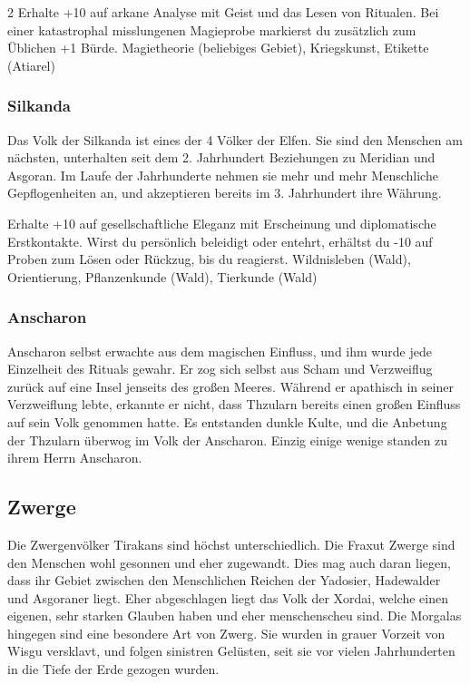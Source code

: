 {\begin{multicols*}{2}
        \abstammungspielwertebox
        {Erhalte +10 auf arkane Analyse mit Geist und das Lesen von Ritualen.}
        {Bei einer katastrophal misslungenen Magieprobe markierst du zusätzlich zum Üblichen +1 Bürde.}
        {Magietheorie (beliebiges Gebiet), Kriegskunst, Etikette (Atiarel)}

        \subsubsection*{Silkanda}
        Das Volk der Silkanda ist eines der 4 Völker der Elfen. Sie sind den Menschen am nächsten, unterhalten seit dem 2. Jahrhundert Beziehungen zu Meridian und Asgoran. Im Laufe der Jahrhunderte nehmen sie mehr und mehr Menschliche Gepflogenheiten an, und akzeptieren bereits im 3. Jahrhundert ihre Währung.

        \abstammungspielwertebox
        {Erhalte +10 auf gesellschaftliche Eleganz mit Erscheinung und diplomatische Erstkontakte.}
        {Wirst du persönlich beleidigt oder entehrt, erhältst du -10 auf Proben zum Lösen oder Rückzug, bis du reagierst.}
        {Wildnisleben (Wald), Orientierung, Pflanzenkunde (Wald), Tierkunde (Wald)}

        \subsubsection*{Anscharon}
        Anscharon selbst erwachte aus dem magischen Einfluss, und ihm wurde jede Einzelheit des Rituals gewahr. Er zog sich selbst aus Scham und Verzweiflug zurück auf eine Insel jenseits des großen Meeres. Während er apathisch in seiner Verzweiflung lebte, erkannte er nicht, dass Thzularn bereits einen großen Einfluss auf sein Volk genommen hatte. Es entstanden dunkle Kulte, und die Anbetung der Thzularn überwog im Volk der Anscharon. Einzig einige wenige standen zu ihrem Herrn Anscharon.

        \subsection{Zwerge}\label{subsec:abstammungen-zwerge}

        Die Zwergenvölker Tirakans sind höchst unterschiedlich. Die Fraxut Zwerge sind den Menschen wohl gesonnen und eher zugewandt. Dies mag auch daran liegen, dass ihr Gebiet zwischen den Menschlichen Reichen der Yadosier, Hadewalder und Asgoraner liegt. Eher abgeschlagen liegt das Volk der Xordai, welche einen eigenen, sehr starken Glauben haben und eher menschenscheu sind. Die Morgalas hingegen sind eine besondere Art von Zwerg. Sie wurden in grauer Vorzeit von Wisgu versklavt, und folgen sinistren Gelüsten, seit sie vor vielen Jahrhunderten in die Tiefe der Erde gezogen wurden.


\end{multicols*}}

